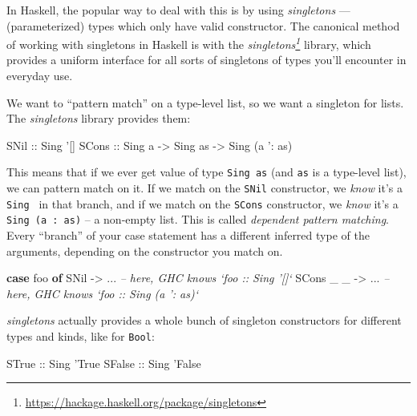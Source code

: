 \documentclass[]{article}
\newenvironment{Shaded}{}{}
\newcommand{\CommentTok}[1]{\textcolor[rgb]{0.38,0.63,0.69}{\textit{#1}}}
\newcommand{\DataTypeTok}[1]{\textcolor[rgb]{0.56,0.13,0.00}{#1}}
\newcommand{\FunctionTok}[1]{\textcolor[rgb]{0.02,0.16,0.49}{#1}}
\newcommand{\KeywordTok}[1]{\textcolor[rgb]{0.00,0.44,0.13}{\textbf{#1}}}
\newcommand{\NormalTok}[1]{#1}
\newcommand{\OtherTok}[1]{\textcolor[rgb]{0.00,0.44,0.13}{#1}}
\renewcommand{\href}[2]{#2\footnote{\url{#1}}}
\begin{document}
In Haskell, the popular way to deal with this is by using \emph{singletons} ---
(parameterized) types which only have valid constructor. The canonical method of
working with singletons in Haskell is with the
\emph{\href{https://hackage.haskell.org/package/singletons}{singletons}}
library, which provides a uniform interface for all sorts of singletons of types
you'll encounter in everyday use.

We want to ``pattern match'' on a type-level list, so we want a singleton for
lists. The \emph{singletons} library provides them:

\begin{Shaded}
\begin{Highlighting}[]
\DataTypeTok{SNil}\OtherTok{  ::} \DataTypeTok{Sing}\NormalTok{ '[]}
\DataTypeTok{SCons}\OtherTok{ ::} \DataTypeTok{Sing}\NormalTok{ a }\OtherTok{->} \DataTypeTok{Sing}\NormalTok{ as }\OtherTok{->} \DataTypeTok{Sing}\NormalTok{ (a '}\FunctionTok{:}\NormalTok{ as)}
\end{Highlighting}
\end{Shaded}

This means that if we ever get value of type \texttt{Sing\ as} (and \texttt{as}
is a type-level list), we can pattern match on it. If we match on the
\texttt{SNil} constructor, we \emph{know} it's a
\texttt{Sing\ \textquotesingle{}{[}{]}} in that branch, and if we match on the
\texttt{SCons} constructor, we \emph{know} it's a
\texttt{Sing\ (a\ \textquotesingle{}:\ as)} -- a non-empty list. This is called
\emph{dependent pattern matching}. Every ``branch'' of your case statement has a
different inferred type of the arguments, depending on the constructor you match
on.

\begin{Shaded}
\begin{Highlighting}[]
\KeywordTok{case}\NormalTok{ foo }\KeywordTok{of}
  \DataTypeTok{SNil}      \OtherTok{->} \FunctionTok{...}   \CommentTok{-- here, GHC knows `foo :: Sing '[]`}
  \DataTypeTok{SCons}\NormalTok{ _ _ }\OtherTok{->} \FunctionTok{...}   \CommentTok{-- here, GHC knows `foo :: Sing (a ': as)`}
\end{Highlighting}
\end{Shaded}

\emph{singletons} actually provides a whole bunch of singleton constructors for
different types and kinds, like for \texttt{Bool}:

\begin{Shaded}
\begin{Highlighting}[]
\DataTypeTok{STrue}\OtherTok{  ::} \DataTypeTok{Sing}\NormalTok{ '}\DataTypeTok{True}
\DataTypeTok{SFalse}\OtherTok{ ::} \DataTypeTok{Sing}\NormalTok{ '}\DataTypeTok{False}
\end{Highlighting}
\end{Shaded}
\end{document}
